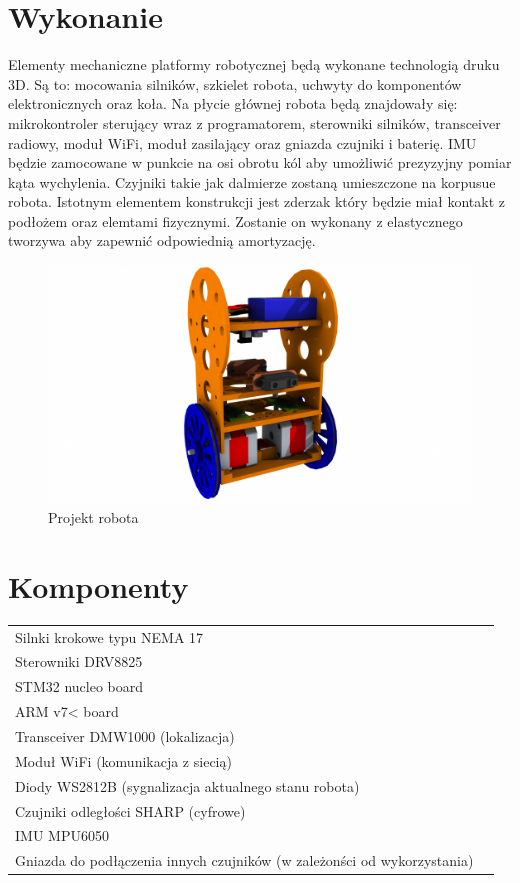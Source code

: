 \documentclass[a4paper, 12pt]{article}
\begin{document}
\section{Wykonanie}
Elementy mechaniczne platformy robotycznej będą wykonane technologią druku 3D. Są to: mocowania silników, szkielet robota, uchwyty do komponentów elektronicznych oraz koła. Na płycie głównej robota będą znajdowały się: mikrokontroler sterujący wraz z programatorem, sterowniki silników, transceiver radiowy, moduł WiFi, moduł zasilający oraz gniazda czujniki i baterię. IMU będzie zamocowane w punkcie na osi obrotu kól aby umożliwić prezyzyjny pomiar kąta wychylenia. Czyjniki takie jak dalmierze zostaną umieszczone na korpusue robota. Istotnym elementem konstrukcji jest zderzak który będzie miał kontakt z podłożem oraz elemtami fizycznymi. Zostanie on wykonany z elastycznego tworzywa aby zapewnić odpowiednią amortyzację.

\begin{figure}
\centering
\includegraphics[width=14cm]{img/mrys.jpg}
\caption{Projekt robota}
\label{fig:projekt}
\end{figure}

\section{Komponenty}
\begin{table}[ht]
	\normalsize
	\begin{tabular}{ll}

    Silnki krokowe typu NEMA 17\\
    Sterowniki DRV8825\\
    STM32 nucleo board\\
    ARM v7< board\\
    Transceiver DMW1000 (lokalizacja)\\
    Moduł WiFi (komunikacja z siecią)\\
    Diody WS2812B (sygnalizacja aktualnego stanu robota)\\
    Czujniki odległości SHARP (cyfrowe)\\
    IMU MPU6050\\
    Gniazda do podłączenia innych czujników (w zależonści od wykorzystania)\\
    
	\end{tabular}
\end{table}


	
\end{document}
